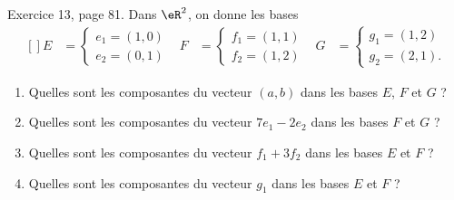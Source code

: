 \begin{exercice}\label{exoLineraire0024}

	Exercice 13, page 81. Dans $\eR^2$, on donne les bases
	\begin{equation}
		\begin{aligned}[]
			E&=\left\{
			\begin{array}{ll}
				e_1=(1,0)\\
				e_2=(0,1)
			\end{array}
			\right.
			&F&=\left\{
			\begin{array}{ll}
				f_1=(1,1)\\
				f_2=(1,2)
			\end{array}
			\right.
			&G&=\left\{
			\begin{array}{ll}
				g_1=(1,2)\\
				g_2=(2,1).
			\end{array}
			\right.
		\end{aligned}
	\end{equation}
	\begin{enumerate}

		\item
			Quelles sont les composantes du vecteur $(a,b)$ dans les bases $E$, $F$ et $G$ ?
		\item
			Quelles sont les composantes du vecteur $7e_1-2e_2$ dans les bases $F$ et $G$ ?
		\item
			Quelles sont les composantes du vecteur $f_1+3f_2$ dans les bases $E$ et $F$ ?
		\item 
			Quelles sont les composantes du vecteur $g_1$ dans les bases $E$ et $F$ ?
	\end{enumerate}

\end{exercice}
